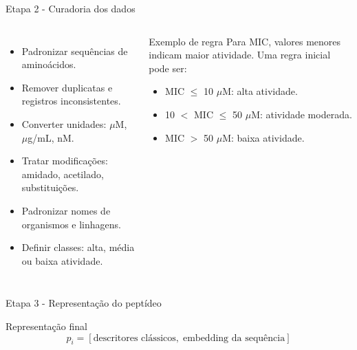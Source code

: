 \documentclass[aspectratio=169,10pt]{beamer}
\begin{document}
\begin{frame}{Etapa 2 - Curadoria dos dados}
\begin{columns}[T]
\begin{itemize}
  \item Padronizar sequências de aminoácidos.
  \item Remover duplicatas e registros inconsistentes.
  \item Converter unidades: $\mu$M, $\mu$g/mL, nM.
  \item Tratar modificações: amidado, acetilado, substituições.
  \item Padronizar nomes de organismos e linhagens.
  \item Definir classes: alta, média ou baixa atividade.
\end{itemize}

\begin{block}{Exemplo de regra}
Para MIC, valores menores indicam maior atividade. Uma regra inicial pode ser:
\begin{itemize}
  \item MIC $\leq$ 10 $\mu$M: alta atividade.
  \item 10 $<$ MIC $\leq$ 50 $\mu$M: atividade moderada.
  \item MIC $>$ 50 $\mu$M: baixa atividade.
\end{itemize}
\end{block}
\end{columns}
\end{frame}

\begin{frame}{Etapa 3 - Representação do peptídeo}
\begin{center}
\end{center}

\vspace{0.15cm}
\begin{block}{Representação final}
\begin{equation*}
  p_i = [\text{descritores clássicos},\; \text{embedding da sequência}]
\end{equation*}
\end{block}
\end{frame}
\end{document}
